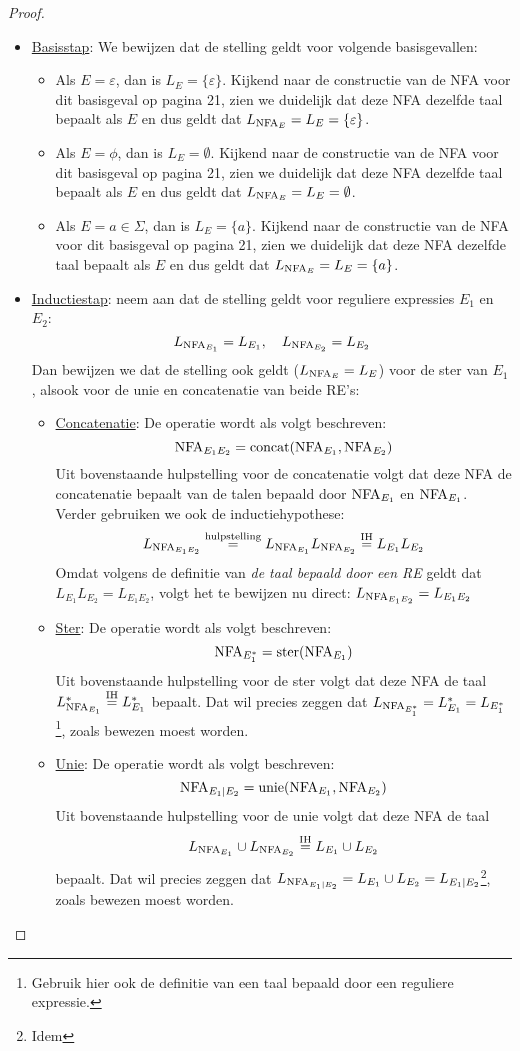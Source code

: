 \documentclass[../aanvullingen_cursus.tex]{subfiles}
\begin{document}
\begin{proof}
	\begin{itemize}
		\item \underline{Basisstap}:
		We bewijzen dat de stelling geldt voor volgende basisgevallen:
		\begin{itemize}
			\item Als \( E=\varepsilon \), dan is \(L_E=\{\varepsilon\}\). Kijkend naar de constructie van de NFA voor dit basisgeval op pagina 21, zien we duidelijk dat deze NFA dezelfde taal bepaalt als \(E\) en dus geldt dat \(L_{\text{NFA}_E}=L_E=\{\varepsilon\}\).
			\item Als \( E=\phi \), dan is \(L_E=\emptyset\). Kijkend naar de constructie van de NFA voor dit basisgeval op pagina 21, zien we duidelijk dat deze NFA dezelfde taal bepaalt als \(E\) en dus geldt dat \(L_{\text{NFA}_E}=L_E=\emptyset\).
			\item Als \( E=a \in \Sigma \), dan is \(L_E=\{a\}\). Kijkend naar de constructie van de NFA voor dit basisgeval op pagina 21, zien we duidelijk dat deze NFA dezelfde taal bepaalt als \(E\) en dus geldt dat \(L_{\text{NFA}_E}=L_E=\{a\}\).
		\end{itemize}
		\item \underline{Inductiestap}: neem aan dat de stelling geldt voor reguliere expressies \(E_1\) en \(E_2\): \[ L_{\text{NFA}_{E_1}} = L_{E_1}, \quad L_{\text{NFA}_{E_2}} = L_{E_2} \] Dan bewijzen we dat de stelling ook geldt (\( L_{\text{NFA}_E}=L_E \)) voor de ster van \(E_1\), alsook voor de unie en concatenatie van beide RE's:
		\begin{itemize}
			\item \underline{Concatenatie}: De operatie wordt als volgt beschreven: \[ \text{NFA}_{E_1E_2}=\operatorname*{concat}(\text{NFA}_{E_1},\text{NFA}_{E_2}) \] Uit bovenstaande hulpstelling voor de concatenatie volgt dat deze NFA de concatenatie bepaalt van de talen bepaald door \( \text{NFA}_{E_1} \) en \( \text{NFA}_{E_1} \). Verder gebruiken we ook de inductiehypothese: \[L_{\text{NFA}_{E_1E_2}} \overset{\text{hulpstelling}}{=} L_{\text{NFA}_{E_1}}L_{\text{NFA}_{E_2}} \overset{\text{IH}}{=} L_{E_1}L_{E_2}\] Omdat volgens de definitie van \textit{de taal bepaald door een RE} geldt dat \(L_{E_1}L_{E_2}=L_{E_1E_2}\), volgt het te bewijzen nu direct: \( L_{\text{NFA}_{E_1E_2}}=L_{E_1E_2} \)
			\item \underline{Ster}: De operatie wordt als volgt beschreven: \[ \text{NFA}_{E_1^*}=\operatorname*{ster}(\text{NFA}_{E_1}) \] Uit bovenstaande hulpstelling voor de ster volgt dat deze NFA de taal \(L_{\text{NFA}_{E_1}}^* \overset{\text{IH}}{=} L_{E_1}^*\) bepaalt. Dat wil precies zeggen dat \(L_{\text{NFA}_{E_1^*}}=L_{E_1}^*=L_{E_1^*}\)\footnote{Gebruik hier ook de definitie van een taal bepaald door een reguliere expressie.}, zoals bewezen moest worden.
			\item \underline{Unie}: De operatie wordt als volgt beschreven: \[ \text{NFA}_{E_1|E_2}=\operatorname*{unie}(\text{NFA}_{E_1},\text{NFA}_{E_2}) \] Uit bovenstaande hulpstelling voor de unie volgt dat deze NFA de taal \[L_{\text{NFA}_{E_1}}\cup L_{\text{NFA}_{E_2}} \overset{\text{IH}}{=} L_{E_1} \cup L_{E_2}\] bepaalt. Dat wil precies zeggen dat \(L_{\text{NFA}_{E_1|E_2}}=L_{E_1} \cup L_{E_2}=L_{E_1 | E_2}\)\footnote{Idem}, zoals bewezen moest worden.
		\end{itemize}
	\end{itemize}

\end{proof}
\end{document}
